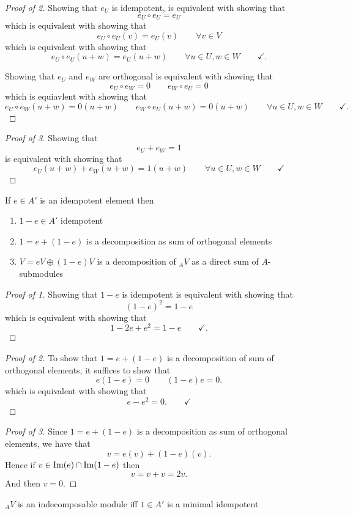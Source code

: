 \begin{proof}[Proof of 2]
Showing that \(e_U\) is idempotent, is equivalent with showing that
\[
e_U\circ e_U=e_U
\]
which is equivalent with showing that
\[
e_U\circ e_U(v)=e_U(v) \qquad \forall v\in V
\]
which is equivalent with showing that
\[
e_U\circ e_U(u+w)=e_U(u+w) \qquad \forall u\in U,w\in W\qquad \checkmark.
\]

Showing that \(e_U\) and \(e_W\) are orthogonal is equivalent with showing that
\[
e_U\circ e_W=0 \qquad e_W\circ e_U=0
\]
which is equiavlent with showing that
\[
e_U\circ e_W(u+w)=0(u+w) \qquad e_W\circ e_U(u+w)=0(u+w) \qquad \forall u\in U,w\in W\qquad \checkmark.
\]
\end{proof}

\begin{proof}[Proof of 3]
Showing that
\[
e_U+e_W=1
\]
is equivalent with showing that
\[
e_U(u+w)+e_W(u+w)=1(u+w) \qquad \forall u\in U,w\in W \qquad \checkmark
\]
\end{proof}

\begin{prop}
If $e\in A'$ is an idempotent element then

\begin{enumerate}
  \item \(1-e\in A'\) idempotent
  \item \(1=e+(1-e)\) is a decomposition as sum of orthogonal elements
  \item \(V=eV\oplus (1-e)V\) is a decomposition of \(_AV\) as a direct sum of \(A\)-submodules
\end{enumerate}
\end{prop}


\begin{proof}[Proof of 1]
Showing that \(1-e\) is idempotent is equivalent with showing that
\[
(1-e)^2=1-e
\]
which is equivalent with showing that
\[
1-2e+e^2=1-e \qquad \checkmark.
\]
\end{proof}

\begin{proof}[Proof of 2]
To show that \(1=e+(1-e)\) is a decomposition of sum of orthogonal elements, it suffices to show that
\[
e(1-e)=0 \qquad (1-e)e=0.
\]
which is equivalent with showing that
\[
e-e^2=0. \qquad \checkmark
\]
\end{proof}

\begin{proof}[Proof of 3]
Since \(1=e+(1-e)\) is a decomposition as sum of orthogonal elements, we have that
\[
v=e(v)+(1-e)(v).
\]
Hence if \(v\in \operatorname{Im}(e) \cap  \operatorname{Im}(1-e)\) then
\[
v=v+v=2v.
\]
And then \(v=0\).
\end{proof}

\begin{thm}
$_AV$ is an indecomposable module iff \(1\in A'\) is a minimal idempotent
\end{thm}
